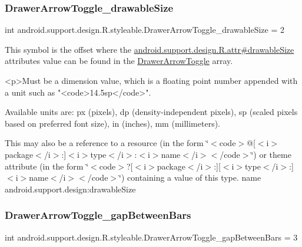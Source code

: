 \subsubsection{\texorpdfstring{Drawer\+Arrow\+Toggle\+\_\+drawable\+Size}{DrawerArrowToggle\_drawableSize}}
{\footnotesize\ttfamily int android.\+support.\+design.\+R.\+styleable.\+Drawer\+Arrow\+Toggle\+\_\+drawable\+Size = 2\hspace{0.3cm}{\ttfamily [static]}}

This symbol is the offset where the \hyperlink{classandroid_1_1support_1_1design_1_1R_1_1attr_a74f0ef8703109da7b9564fb1dd4c2a70}{android.\+support.\+design.\+R.\+attr\#drawable\+Size} attribute\textquotesingle{}s value can be found in the \hyperlink{classandroid_1_1support_1_1design_1_1R_1_1styleable_a559d22c78738e5161420dc4b41689c1b}{Drawer\+Arrow\+Toggle} array.

\begin{DoxyVerb}      <p>Must be a dimension value, which is a floating point number appended with a unit such as "<code>14.5sp</code>".
\end{DoxyVerb}
 Available units are\+: px (pixels), dp (density-\/independent pixels), sp (scaled pixels based on preferred font size), in (inches), mm (millimeters). 

This may also be a reference to a resource (in the form \char`\"{}$<$code$>$@\mbox{[}$<$i$>$package$<$/i$>$\+:\mbox{]}$<$i$>$type$<$/i$>$\+:$<$i$>$name$<$/i$>$$<$/code$>$\char`\"{}) or theme attribute (in the form \char`\"{}$<$code$>$?\mbox{[}$<$i$>$package$<$/i$>$\+:\mbox{]}\mbox{[}$<$i$>$type$<$/i$>$\+:\mbox{]}$<$i$>$name$<$/i$>$$<$/code$>$\char`\"{}) containing a value of this type.  name android.\+support.\+design\+:drawable\+Size \mbox{\label{classandroid_1_1support_1_1design_1_1R_1_1styleable_aa48d199f2cd1185a5c6a23528050d749}} 
\subsubsection{\texorpdfstring{Drawer\+Arrow\+Toggle\+\_\+gap\+Between\+Bars}{DrawerArrowToggle\_gapBetweenBars}}
{\footnotesize\ttfamily int android.\+support.\+design.\+R.\+styleable.\+Drawer\+Arrow\+Toggle\+\_\+gap\+Between\+Bars = 3\hspace{0.3cm}{\ttfamily [static]}}

